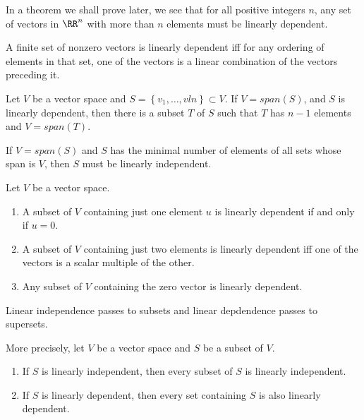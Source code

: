 \begin{remark}
  In a theorem we shall prove later, we see that for all positive integers $n$, any set of vectors in 
  $\RR^{n}$ with more than $n$ elements must be linearly dependent.
\end{remark}

\begin{theorem}
  A finite set of nonzero vectors is linearly dependent iff for any ordering of elements in that set, 
  one of the vectors is a linear combination of the vectors preceding it.
\end{theorem}

\begin{corollary}
  Let $V$ be a vector space and $S = \left\{v_{1}, \dots, vln\right\} \subset V$. 
  If $V = span(S)$, and $S$ is linearly dependent, then there is a subset $T$ of $S$ such that $T$
  has $n - 1$ elements and $V = span(T)$.
\end{corollary}

\begin{corollary}
  If $V = span(S)$ and $S$ has the minimal number of elements of all sets whose span is $V$, then
  $S$ must be linearly independent.
\end{corollary}

\begin{theorem}
  Let $V$ be a vector space.
  \begin{enumerate}[(1)]
    \item A subset of $V$ containing just one element $u$ is linearly dependent if and only if $u = 0$.
    \item A subset of $V$ containing just two elements is linearly dependent iff one of the vectors
      is a scalar multiple of the other.
    \item Any subset of $V$ containing the zero vector is linearly dependent.
  \end{enumerate}
\end{theorem}

  Linear independence passes to subsets and linear depdendence passes to supersets.
\begin{theorem}
  More precisely, let $V$ be a vector space and $S$ be a subset of $V$.
  \begin{enumerate}[(1)]
    \item If $S$ is linearly independent, then every subset of $S$ is linearly independent.
    \item If $S$ is linearly dependent, then every set containing $S$ is also linearly dependent.
  \end{enumerate}
\end{theorem}

